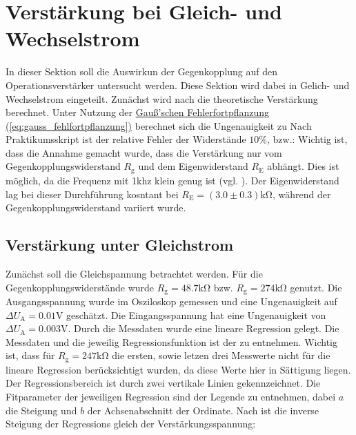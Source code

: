 \newpage

\section{Verstärkung bei Gleich- und Wechselstrom}
\label{sec:A1}
In dieser Sektion soll die Auswirkun der Gegenkopplung auf den Operationsverstärker untersucht werden. Diese Sektion wird dabei in Gelich- und Wechselstrom eingeteilt.
Zunächst wird nach  die theoretische Verstärkung berechnet. Unter Nutzung der \hyperref[eq:gauss_fehlfortpflanzung]{Gauß'schen Fehlerfortpflanzung (\ref*{eq:gauss_fehlfortpflanzung})} berechnet sich die Ungenauigkeit zu
Nach Praktikumsskript \cite{skriptPAP22} ist der relative Fehler der Widerstände $10\%$, bzw.:
Wichtig ist, dass die Annahme gemacht wurde, dass die Verstärkung nur vom Gegenkopplungswiderstand $R_\text{g}$ und dem Eigenwiderstand $R_\text{E}$ abhängt. Dies ist möglich, da die Frequenz mit 1khz klein genug ist (vgl. ). 
Der Eigenwiderstand lag bei dieser Durchführung kosntant bei $R_\text{E} = (3.0 \pm 0.3) \mathrm{k\Omega}$, während der Gegenkopplungswiderstand variiert wurde.

\subsection{Verstärkung unter Gleichstrom}
Zunächst soll die Gleichspannung betrachtet werden. Für die Gegenkopplungswiderstände wurde $R_\text{g} = 48.7 \mathrm{k\Omega}$ bzw. $R_\text{g} = 274 \mathrm{k\Omega}$ genutzt. Die Ausgangsspannung wurde im Osziloskop gemessen und eine Ungenauigkeit auf $\Delta U_\text{A} = 0.01$V geschätzt. Die Eingangsspannung hat eine Ungenauigkeit von $\Delta U_\text{A} = 0.003$V.
Durch die Messdaten wurde eine lineare Regression gelegt. Die Messdaten und die jeweilig Regressionsfunktion ist der  zu entnehmen. 
Wichtig ist, dass für $R_\text{g} = 247 \mathrm{k\Omega}$ die ersten, sowie letzen drei Messwerte nicht für die lineare Regression berücksichtigt wurden, da diese Werte hier in Sättigung liegen. Der Regressionsbereich ist durch zwei vertikale Linien gekennzeichnet. Die Fitparameter der jeweiligen Regression sind der Legende zu entnehmen, dabei $a$ die Steigung und $b$ der Achsenabschnitt der Ordinate.
Nach  ist die inverse Steigung der Regressions gleich der Verstärkungsspannung:


